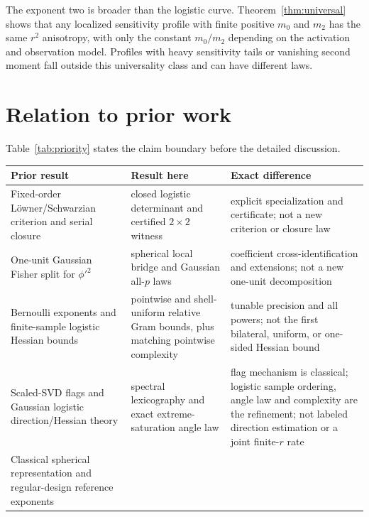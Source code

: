 \documentclass[11pt]{article}
\begin{document}
The exponent two is broader than the logistic curve.  Theorem~\ref{thm:universal} shows that any localized
sensitivity profile with finite positive $m_0$ and $m_2$ has the same $r^2$ anisotropy, with only the constant
$m_0/m_2$ depending on the activation and observation model.  Profiles with heavy sensitivity tails or vanishing
second moment fall outside this universality class and can have different laws.



\section{Relation to prior work}

Table~\ref{tab:priority} states the claim boundary before the detailed discussion.
\begin{table}[H]
\centering
\small
\begin{tabular}{>{\raggedright\arraybackslash}p{}
                >{\raggedright\arraybackslash}p{}
                >{\raggedright\arraybackslash}p{}}
\toprule
Prior result & Result here & Exact difference \\
\midrule
Fixed-order L\"owner/Schwarzian criterion and serial closure
\cite{kozlovski2008,cook2023}
& closed logistic determinant and certified $2\times2$ witness
& explicit specialization and certificate; not a new criterion or closure law \\[3pt]
One-unit Gaussian Fisher split for $\phi'^2$ \cite{amari2019}
& spherical local bridge and Gaussian all-$p$ laws
& coefficient cross-identification and extensions; not a new one-unit decomposition \\[3pt]
Bernoulli exponents and finite-sample logistic Hessian bounds
\cite{chen2026gd,ostrovskii2021,chardon2024,fisher2023}
 & pointwise and shell-uniform relative Gram bounds, plus matching pointwise complexity
 & tunable precision and all powers; not the first bilateral, uniform, or one-sided Hessian bound \\[3pt]
 Scaled-SVD flags \cite{stewart1984} and Gaussian logistic direction/Hessian theory
 \cite{hsu2024,chardon2024,chen2026gd,chen2026minimax}
 & spectral lexicography and exact extreme-saturation angle law
 & flag mechanism is classical; logistic sample ordering, angle law and complexity are the refinement; not labeled
 direction estimation or a joint finite-$r$ rate \\[3pt]
 Classical spherical representation \cite{cambanis1981} and regular-design reference exponents \cite{chardon2024}

\end{tabular}
\end{table}
\end{document}

